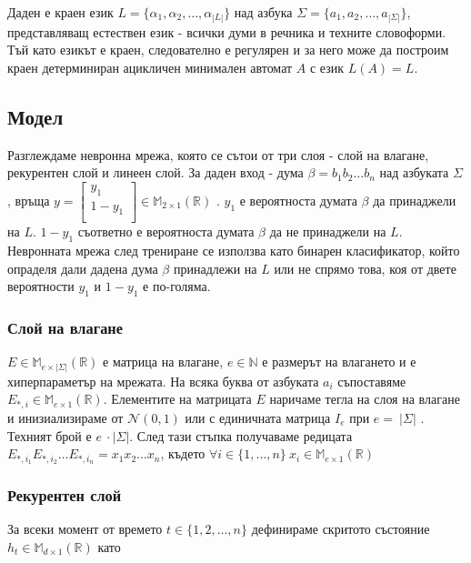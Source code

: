 \documentclass[a4paper,12pt]{article}
\begin{document}
Даден е краен език $L = \{\alpha_1, \alpha_2, \ldots, \alpha_{|L|}\}$ над азбука $\Sigma = \{a_1, a_2, \ldots, a_{|\Sigma|}\}$, представляващ естествен език - всички думи в речника и техните словоформи. Тъй като езикът е краен, следователно е регулярен и за него може да построим краен детерминиран ацикличен минимален автомат $A$ с език $L(A) = L$.

\subsection{Модел}

Разглеждаме невронна мрежа, която се сътои от три слоя - слой на влагане, рекурентен слой и  линеен слой. За даден вход - дума $\beta = b_1 b_2 \ldots b_n$ над азбуката $\Sigma$,  връща $y = \begin{bmatrix}
  y_1 \\ 
  1 - y_1 \\ 
\end{bmatrix} \in \mathbb{M}_{2 \times 1} (\mathbb{R})$ . $y_1$ е вероятноста думата $\beta$ да принаджели на $L$. $1 - y_1$ съответно е вероятноста думата $\beta$ да не принаджели на $L$. Невронната мрежа след трениране се използва като бинарен класификатор, който опраделя дали дадена дума $\beta$ принадлежи на $L$ или не спрямо това, коя от двете вероятности $y_1$ и $1 - y_1$ е по-голяма.

\subsubsection{Слой на влагане}

$E \in \mathbb{M}_{e \times |\Sigma|} (\mathbb{R})$ е матрица на влагане, $e \in \mathbb{N}$ е размерът на влагането и е хиперпараметър на мрежата. 
На всяка буква от азбуката $a_i$ съпоставяме $E_{*, i} \in \mathbb{M}_{e \times 1} (\mathbb{R})$. Елементите на матрицата $E$ наричаме тегла на слоя на влагане и инизиализираме от $\mathcal{N}(0, 1)$ или с единичната матрица $I_e$ при $e =\:|\Sigma|$ . Техният брой е $e\:\cdot |\Sigma|$. След тази стъпка получаваме редицата $E_{*, i_1}E_{*, i_2} \ldots E_{*, i_n} = x_1 x_2 \ldots x_n$, където $\forall i \in \{1, \ldots, n\} \: x_i \in \mathbb{M}_{e \times 1} (\mathbb{R})$

\subsubsection{Рекурентен слой}

За всеки момент от времето $t \in \{1, 2, \ldots, n\}$ дефинираме скритото състояние $h_t \in \mathbb{M}_{d \times 1} (\mathbb{R})$ като
\end{document}
